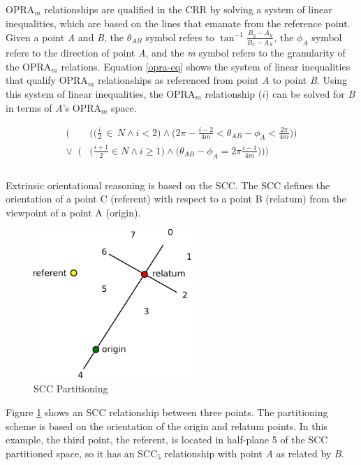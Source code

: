 \documentclass[12pt]{ucthesis}
\begin{document}
OPRA$_{m}$ relationships are qualified in the CRR by solving a system of linear inequalities, which are based on the lines that emanate from the reference point. Given a point \emph{A} and \emph{B}, the $\theta_{AB}$ symbol refers to $ \tan^{-1} \frac{B_{y} - A_{y}}{B_{x} - A_{X}} $, the $\phi_{A}$ symbol refers to the direction of point \emph{A}, and the \emph{m} symbol refers to the granularity of the OPRA$_{m}$ relations. Equation \ref{opra-eq} shows the system of linear inequalities that qualify OPRA$_{m}$ relationships as referenced from point \emph{A} to point \emph{B}. Using this system of linear inequalities, the OPRA$_{m}$ relationship ($i$) can be solved for \emph{B} in terms of \emph{A}'s OPRA$_{m}$ space.

\begin{equation}\label{opra-eq}
\begin{aligned}
\Big(&\Big(\Big(\frac{i}{2} \, \in \, N \wedge i < 2\Big) \wedge \Big(2\pi - \frac{i-2}{4m} < \theta_{AB} - \phi_{A} < \frac{2\pi}{4m}\Big)\Big) \\
\lor \;\; \Big(&\Big(\frac{i+1}{2} \in N \wedge i \geq 1\Big) \wedge \Big(\theta_{AB} - \phi_{A} = 2\pi \frac{i-1}{4m}\Big)\Big)\Big) \\ \\
\end{aligned}
\end{equation}

Extrinsic orientational reasoning is based on the SCC. The SCC defines the orientation of a point C (referent) with respect to a point B (relatum) from the viewpoint of a point A (origin).

\begin{figure}[H]
\centering
\includegraphics[width=60mm]{scc}
\caption{SCC Partitioning}
\label{scc-partitioning}
\end{figure}

Figure \ref{scc-partitioning} shows an SCC relationship between three points. The partitioning scheme is based on the orientation of the origin and relatum points. In this example, the third point, the referent, is located in half-plane 5 of the SCC partitioned space, so it has an SCC$_{5}$ relationship with point \emph{A} as related by \emph{B}. 
\end{document}
